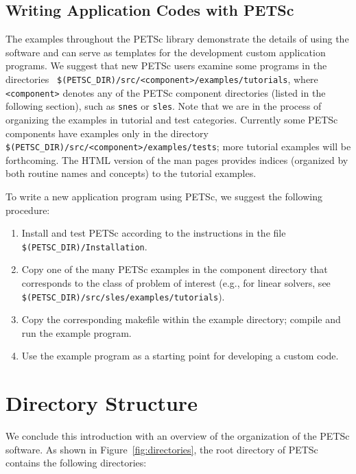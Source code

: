 \subsection*{Writing Application Codes with PETSc}

The examples throughout the PETSc library demonstrate the details of
using the software and can serve as templates for the development
custom application programs.  We suggest that new PETSc
users examine some programs in the directories {\tt
\$(PETSC\_DIR)/src/<component>/examples/tutorials}, where {\tt <component>}
denotes any of the PETSc component directories (listed in the following
section), such as {\tt snes} or {\tt sles}.  Note that we are in
the process of organizing the examples in tutorial and test categories.
Currently some PETSc components have examples only in the directory
{\tt \$(PETSC\_DIR)/src/<component>/examples/tests}; more tutorial examples
will be forthcoming.  The HTML version of the man pages provides indices
(organized by both routine names and concepts) to the tutorial examples.

To write a new application program using PETSc, we suggest the
following procedure:
\begin{enumerate}
\item Install and test PETSc according to the instructions in the file
      {\tt \$(PETSC\_DIR)/Installation}.
\item Copy one of the many PETSc examples in the component directory
      that corresponds to the class of problem of interest (e.g.,
      for linear solvers, see {\tt \$(PETSC\_DIR)/src/sles/examples/tutorials}).
\item Copy the corresponding makefile within the example directory;
      compile and run the example program.
\item Use the example program as a starting point for developing a custom code.
\end{enumerate}


\section{Directory Structure}

We conclude this introduction with an overview of the
organization of the PETSc software.  As shown in Figure~\ref{fig:directories},
the root directory of PETSc contains the following directories:

